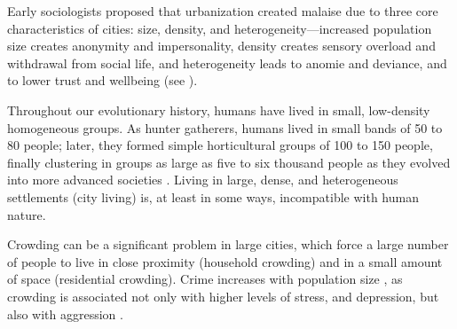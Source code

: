 \documentclass[11pt, letterpaper]{article}
\begin{document}
\begin{spacing}{1.4}
Early sociologists proposed that urbanization created malaise due to three core characteristics of cities: size, density, and heterogeneity---increased population size creates anonymity and
 impersonality, density creates sensory overload and withdrawal from social
 life, and heterogeneity leads to anomie and deviance, and to lower trust and wellbeing (see \citet{park84,
   simmel03, tonnies57, wirth38,putnam07,aok_brfss_segregation15,herbst14,postmes02,vogt07,smelser99}).
%

Throughout our evolutionary history, humans have lived in small, low-density
homogeneous groups. As hunter gatherers, humans lived in small bands of 50 to 80
people; later, they formed simple horticultural groups of 100 to 150 people,
finally clustering in groups as large as five to six thousand people as they
evolved into more advanced societies \citep{maryanski92}.  Living in large,
dense, and heterogeneous settlements (city living) is, at least in some ways, incompatible with human nature.

%
Crowding can be a significant problem in large cities, which force a large number of people to live in close proximity (household crowding) and in a small amount of space (residential crowding). Crime increases with population size \citep{bettencourt10b}, as crowding is associated not only with higher levels of stress, and depression, but also with aggression \citep{regoeczi2008,calhoun62}. 


\end{spacing}
\end{document}
